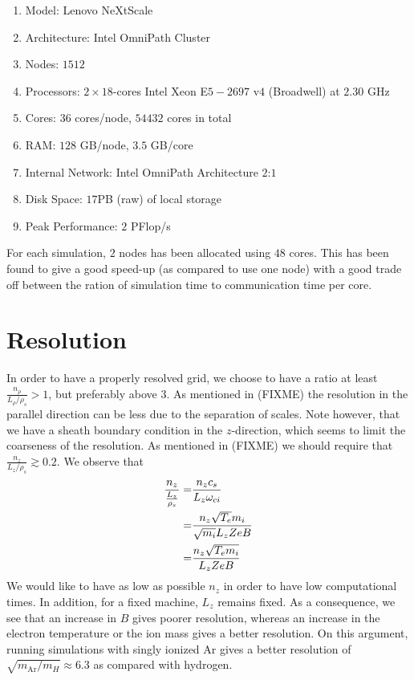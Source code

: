 \begin{enumerate}[noitemsep]
    \item Model: Lenovo NeXtScale
    \item Architecture: Intel OmniPath Cluster
    \item Nodes: $1512$
    \item Processors: $2\times18$-cores Intel Xeon E$5-2697$ v$4$ (Broadwell) at $2.30$ GHz
    \item Cores: $36$ cores/node, $54432$ cores in total
    \item RAM: $128$ GB/node, $3.5$ GB/core
    \item Internal Network: Intel OmniPath Architecture $2$:$1$
    \item Disk Space: $17$PB (raw) of local storage
    \item Peak Performance: $2$ PFlop/s
\end{enumerate}
%
For each simulation, $2$ nodes has been allocated using $48$ cores.
This has been found to give a good speed-up (as compared to use one node) with a good trade off between the ration of simulation time to communication time per core.

\section{Resolution}
\label{sec:resolution}
%
In order to have a properly resolved grid, we choose to have a ratio at least $\frac{n_\rho}{L_\rho/\rho_s}>1$, but preferably above $3$.
As mentioned in (FIXME)
the resolution in the parallel direction can be less due to the separation of scales.
Note however, that we have a sheath boundary condition in the $z$-direction, which seems to limit the coarseness of the resolution.
As mentioned in (FIXME)
we should require that $\frac{n_z}{L_z/\rho_s}\gtrsim0.2$.
We observe that
%
\begin{align*}
    \frac{n_z}{\frac{L_z}{\rho_s}}
    =& \frac{n_zc_s}{L_z \omega_{ci}}
    \\
    =& \frac{n_z\sqrt{T_e}m_i}{\sqrt{m_i} L_z ZeB}
    \\
    =& \frac{n_z\sqrt{T_em_i}}{L_z ZeB}
\end{align*}
%
We would like to have as low as possible $n_z$ in order to have low computational times.
In addition, for a fixed machine, $L_z$ remains fixed.
As a consequence, we see that an increase in $B$ gives poorer resolution, whereas an increase in the electron temperature or the ion mass gives a better resolution.
On this argument, running simulations with singly ionized Ar gives a better resolution of $\sqrt{m_{\text{Ar}}/m_H}\approx6.3$ as compared with hydrogen.
